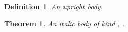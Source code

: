 \documentclass{article}
\newtheorem{defn}{Definition}
\newtheorem{thm}{Theorem}
\begin{document}
\begin{defn}An upright body.\end{defn}
\begin{thm}An italic body of kind \thmkind, \thmnote.\end{thm}
\end{document}
